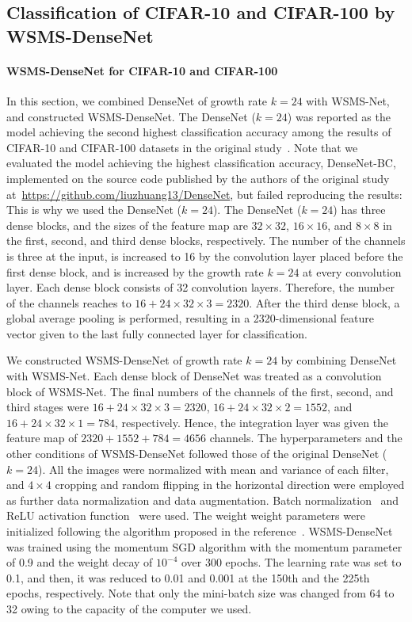 \documentclass[journal]{IEEEtran}
\begin{document}
\subsection{Classification of CIFAR-10 and CIFAR-100 by WSMS-DenseNet}

\paragraph*{\textbf{WSMS-DenseNet for CIFAR-10 and CIFAR-100}}

In this section, we combined DenseNet of growth rate $k=24$ with WSMS-Net, and constructed WSMS-DenseNet.
The DenseNet ($k=24$) was reported as the model achieving the second highest classification accuracy among the results of CIFAR-10 and CIFAR-100 datasets in the original study~\cite{Huang2016b}.
Note that we evaluated the model achieving the highest classification accuracy, DenseNet-BC, implemented on the source code published by the authors of the original study at~\url{https://github.com/liuzhuang13/DenseNet}, but failed reproducing the results: This is why we used the DenseNet ($k=24$).
The DenseNet ($k=24$) has three dense blocks, and the sizes of the feature map are $32\times32$, $16\times16$, and $8\times8$ in the first, second, and third dense blocks, respectively.
The number of the channels is three at the input, is increased to 16 by the convolution layer placed before the first dense block, and is increased by the growth rate $k=24$ at every convolution layer.
Each dense block consists of 32 convolution layers.
Therefore, the number of the channels reaches to $16+24\times32\times3=2320$.
After the third dense block, a global average pooling is performed, resulting in a 2320-dimensional feature vector given to the last fully connected layer for classification.

We constructed WSMS-DenseNet of growth rate $k=24$ by combining DenseNet with WSMS-Net.
Each dense block of DenseNet was treated as a convolution block of WSMS-Net.
The final numbers of the channels of the first, second, and third stages were $16+24\times32\times3=2320$, $16+24\times32\times2=1552$, and $16+24\times32\times1=784$, respectively.
Hence, the integration layer was given the feature map of $2320+1552+784=4656$ channels.
The hyperparameters and the other conditions of WSMS-DenseNet followed those of the original DenseNet ($k=24$).
All the images were normalized with mean and variance of each filter, and $4\times4$ cropping and random flipping in the horizontal direction were employed as further data normalization and data augmentation.
Batch normalization~\cite{Ioffe2015} and ReLU activation function~\cite{Nair2010} were used.
The weight weight parameters were initialized following the algorithm proposed in the reference~\cite{He2016a}.
WSMS-DenseNet was trained using the momentum SGD algorithm with the momentum parameter of 0.9 and the weight decay of $10^{-4}$ over 300 epochs.
The learning rate was set to 0.1, and then, it was reduced to 0.01 and 0.001 at the 150th and the 225th epochs, respectively.
Note that only the mini-batch size was changed from 64 to 32 owing to the capacity of the computer we used.
\end{document}
